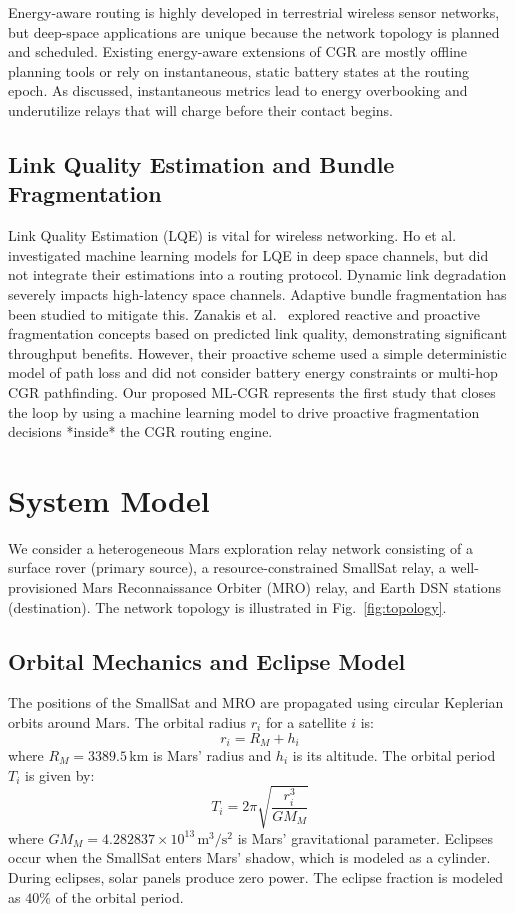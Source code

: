 \documentclass[a4paper,fleqn]{cas-dc}
\newcommand{\mlcgr}{\textsf{ML-CGR}}
\begin{document}
Energy-aware routing is highly developed in terrestrial wireless sensor networks, but deep-space applications are unique because the network topology is planned and scheduled. Existing energy-aware extensions of CGR are mostly offline planning tools or rely on instantaneous, static battery states at the routing epoch. As discussed, instantaneous metrics lead to energy overbooking and underutilize relays that will charge before their contact begins.

\subsection{Link Quality Estimation and Bundle Fragmentation}
Link Quality Estimation (LQE) is vital for wireless networking. Ho et al.~\cite{ho2023lqe} investigated machine learning models for LQE in deep space channels, but did not integrate their estimations into a routing protocol. Dynamic link degradation severely impacts high-latency space channels. Adaptive bundle fragmentation has been studied to mitigate this. Zanakis et al.~\cite{zanakis2022fragmentation} explored reactive and proactive fragmentation concepts based on predicted link quality, demonstrating significant throughput benefits. However, their proactive scheme used a simple deterministic model of path loss and did not consider battery energy constraints or multi-hop CGR pathfinding. Our proposed \mlcgr{} represents the first study that closes the loop by using a machine learning model to drive proactive fragmentation decisions *inside* the CGR routing engine.

\section{System Model}
\label{sec:system}

We consider a heterogeneous Mars exploration relay network consisting of a surface rover (primary source), a resource-constrained SmallSat relay, a well-provisioned Mars Reconnaissance Orbiter (MRO) relay, and Earth DSN stations (destination). The network topology is illustrated in Fig.~\ref{fig:topology}.

\subsection{Orbital Mechanics and Eclipse Model}
The positions of the SmallSat and MRO are propagated using circular Keplerian orbits around Mars. The orbital radius $r_i$ for a satellite $i$ is:
\begin{equation}
    r_i = R_M + h_i
\end{equation}
where $R_M = 3389.5\,$km is Mars' radius and $h_i$ is its altitude. The orbital period $T_i$ is given by:
\begin{equation}
    T_i = 2\pi \sqrt{\frac{r_i^3}{GM_M}}
\end{equation}
where $GM_M = 4.282837 \times 10^{13}\,\text{m}^3/\text{s}^2$ is Mars' gravitational parameter. Eclipses occur when the SmallSat enters Mars' shadow, which is modeled as a cylinder. During eclipses, solar panels produce zero power. The eclipse fraction is modeled as $40\%$ of the orbital period.
\end{document}
